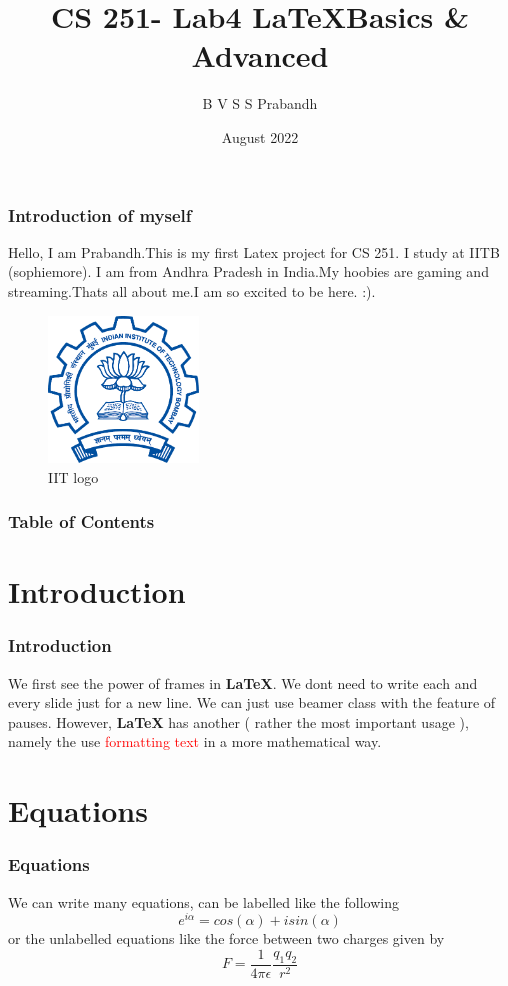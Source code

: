 \documentclass{beamer}
\title[Latex basics \& Advanced] 
{CS 251- Lab4 \LaTeX Basics \& Advanced}
\author[B V S S Prabandh] 
{B V S S Prabandh}
\institute[IITB] 
{
  IIT Bombay
}
\date[2022]
{August 2022}
\begin{document}
\frame{\titlepage}

\begin{frame}
\frametitle{Introduction of myself}
Hello, I am Prabandh.This is my first Latex project for CS 251. I study at IITB  (sophiemore). I am from 
Andhra Pradesh in India.My hoobies are gaming and streaming.Thats all about me.I am so excited to be here. :).
\begin{figure}[htp]
    \centering
    \includegraphics[width=4cm]{iitb.png}
    \caption{IIT logo}
    \label{fig:school}
\end{figure}
\end{frame}
\begin{frame}
\frametitle{Table of Contents}
\tableofcontents
\end{frame}
\section{Introduction}
\begin{frame}
\frametitle{Introduction}
  We first see the power of frames in \textbf{\LaTeX}. We dont need to write each
and every slide just for a new line.
\pause
    We can just use beamer class with the feature of pauses.
\pause
    However, \textbf{\LaTeX} has another ( rather the most important usage ), namely the use \textcolor{red}{formatting text} in a more mathematical way.
\end{frame}
\section{Equations}
\begin{frame}
\frametitle{Equations}
 We can write many equations, can be labelled like the following
\begin{equation}
e^{i\alpha}=cos(\alpha)+isin(\alpha) 
\end{equation}
\pause
    or the unlabelled equations like the force between two charges given by
    \[F=\frac{1}{4\pi\epsilon}\frac{q_1q_2}{r^2}\]
\end{frame}
\end{document}
